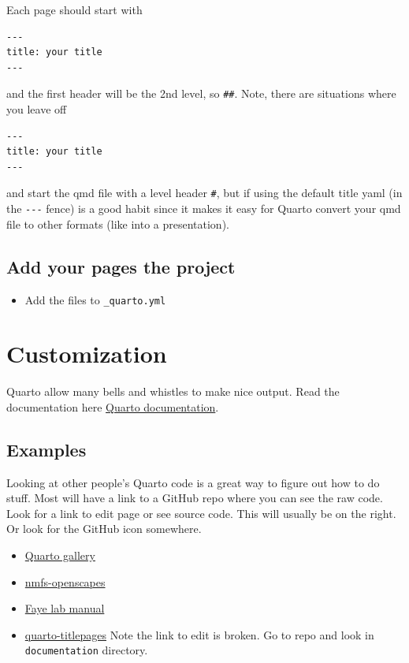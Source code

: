 \documentclass[
  letterpaper,
  oneside,
  open=any]{scrbook}
\providecommand{\tightlist}{%
  \setlength{\itemsep}{0pt}\setlength{\parskip}{0pt}}\usepackage{longtable,booktabs,array}
\begin{document}
Each page should start with

\begin{verbatim}
---
title: your title
---
\end{verbatim}

and the first header will be the 2nd level, so \texttt{\#\#}. Note,
there are situations where you leave off

\begin{verbatim}
---
title: your title
---
\end{verbatim}

and start the qmd file with a level header \texttt{\#}, but if using the
default title yaml (in the \texttt{-\/-\/-} fence) is a good habit since
it makes it easy for Quarto convert your qmd file to other formats (like
into a presentation).

\hypertarget{add-your-pages-the-project}{%
\section{Add your pages the project}\label{add-your-pages-the-project}}

\begin{itemize}
\tightlist
\item
  Add the files to \texttt{\_quarto.yml}
\end{itemize}


\hypertarget{customization}{%
\chapter{Customization}\label{customization}}

Quarto allow many bells and whistles to make nice output. Read the
documentation here \href{https://quarto.org/docs/guide/}{Quarto
documentation}.

\hypertarget{examples}{%
\section{Examples}\label{examples}}

Looking at other people's Quarto code is a great way to figure out how
to do stuff. Most will have a link to a GitHub repo where you can see
the raw code. Look for a link to edit page or see source code. This will
usually be on the right. Or look for the GitHub icon somewhere.

\begin{itemize}
\tightlist
\item
  \href{https://quarto.org/docs/gallery/}{Quarto gallery}
\item
  \href{https://nmfs-openscapes.github.io/}{nmfs-openscapes}
\item
  \href{https://thefaylab.github.io/lab-manual/}{Faye lab manual}
\item
  \href{https://nmfs-opensci.github.io/quarto_titlepages/}{quarto-titlepages}
  Note the link to edit is broken. Go to repo and look in
  \texttt{documentation} directory.
\end{itemize}
\end{document}
